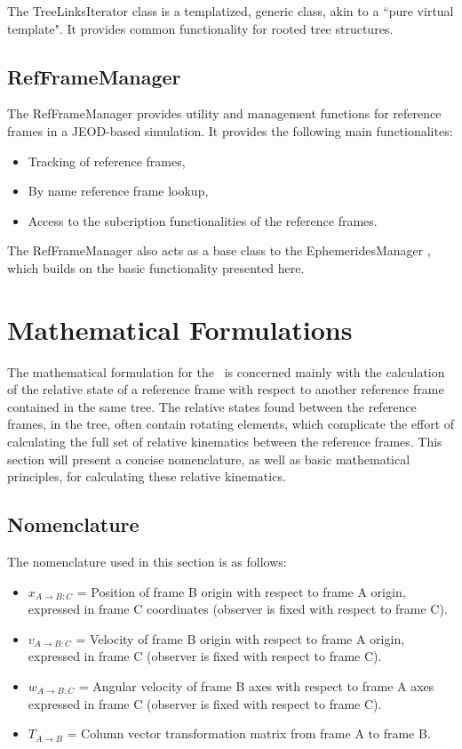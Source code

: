 The TreeLinksIterator class is a templatized, generic class, akin to a
``pure virtual template". It provides common functionality for rooted tree
structures.

\subsection{RefFrameManager}

The RefFrameManager provides utility and management functions for reference
frames in a JEOD-based simulation. It provides the following main functionalites:

\begin{itemize}
\item{Tracking of reference frames},
\item{By name reference frame lookup},
\item{Access to the subcription functionalities of the reference frames}.
\end{itemize}

The RefFrameManager also acts as a base class to the EphemeridesManager
\cite{dynenv:EPHEMERIDES}, which builds on the basic functionality presented here.

\section{Mathematical Formulations}

The mathematical formulation for the \ is concerned mainly
with the calculation of the relative state of a reference frame with respect
to another reference frame contained in the same tree. The relative states
found between the reference frames, in the tree, often contain rotating
elements, which complicate the effort of calculating the full set of
relative kinematics between the reference frames. This section will present
a concise nomenclature, as well as basic mathematical principles, for
calculating these relative kinematics.

\subsection{Nomenclature}

The nomenclature used in this section is as follows:

\begin{itemize}

\item{$x_{A \rightarrow B:C}$}  = Position of frame B origin
with respect to frame A origin, expressed in frame C coordinates (observer is
fixed with respect to frame C).
\item{$v_{A \rightarrow B:C}$}  = Velocity of frame B origin
with respect to frame A origin, expressed in frame C (observer is fixed with
respect to frame C).
\item{$w_{A \rightarrow B:C}$}  = Angular velocity of frame B axes with respect
to frame A axes expressed in frame C (observer is fixed with respect to frame C).
\item{$T_{A \rightarrow B}$}    = Column vector transformation
matrix from frame A to frame B.
\end{itemize}

